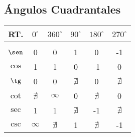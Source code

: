 \documentclass[12pt, a5paper]{article}
\begin{document}
\subsection*{Ángulos Cuadrantales}
\begin{tabular}{c|ccccc}
RT. & $0^{\circ}$ & $360^{\circ}$ & $90^{\circ}$ & $180^{\circ}$ & $270^{\circ}$ \\
\hline \\
$\sen$ & 0 & 0 & 1 & 0 & -1 \\
$\cos$ & 1 & 1 & 0 & -1 & 0 \\
$\tg$ & 0 & 0 & $\nexists$ & 0 & $\nexists$ \\
$\cot$ & $\nexists$ & $\infty$ & 0 & $\nexists$ & 0 \\
$\sec$ & 1 & 1 & $\nexists$ & -1 & $\nexists$ \\
$\csc$ & $\infty$ & $\nexists$ & 1 & $\nexists$ & -1
\end{tabular}
\end{document}
